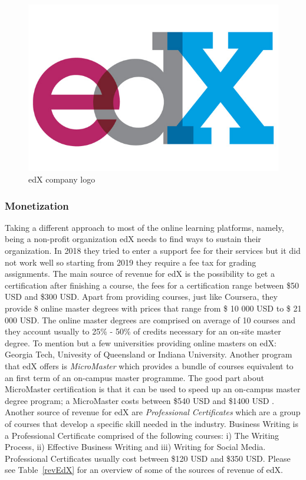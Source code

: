 \documentclass[11]{article}
\begin{document}
\begin{figure}[H]

	\centering
	\includegraphics[width = 0.35 \textwidth]{edXLogo.jpg}
	\caption{edX company logo}
	\label{edXLogo}

\end{figure}
	\subsubsection{Monetization}
	Taking a different approach to most of the online learning platforms, namely, being a non-profit organization edX needs to find ways to sustain their organization. In 2018 they tried to enter a support fee for their services but it did not work well so starting from 2019 they require a fee tax for grading assignments. The main source of revenue for edX is the possibility to get a certification after finishing a course, the fees for a certification range between \$50 USD and \$300 USD. Apart from providing courses, just like Coursera, they provide 8 online master degrees with prices that range from \$ 10 000 USD to \$ 21 000 USD. The online master degrees are comprised on average of 10 courses and they account usually to 25\% - 50\% of credits necessary for an on-site master degree. To mention but a few universities providing online masters on edX: Georgia Tech, Univesity of Queensland or Indiana University. Another program that edX offers is \textit{MicroMaster} which provides a bundle of courses equivalent to an first term of an on-campus master programme. The good part about MicroMaster certification is that it can be used to speed up an on-campus master degree program; a MicroMaster costs between \$540 USD and \$1400 USD . Another source of revenue for edX are \textit{Professional Certificates} which are a group of courses that develop a specific skill needed in the industry. Business Writing is a  Professional Certificate comprised of the following courses: i) The Writing Process, ii) Effective Business Writing and iii) Writing for Social Media. Professional Certificates usually cost between \$120 USD and \$350 USD. Please see Table~\ref{revEdX} for an overview of some of the sources of revenue of edX.
\end{document}
